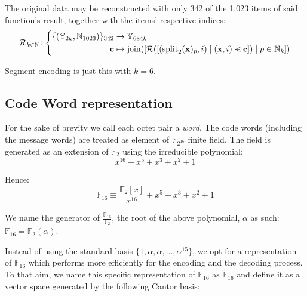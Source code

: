 The original data may be reconstructed with only 342 of the 1,023 items of said function's result, together with the items' respective indices:
\begin{equation}\label{eq:erasurecodinginv}
  \mathcal{R}_{k \in \N}\colon\left\{\begin{aligned}
    \{(\Y_{2k}, \N_{1023})\}_{342} &\to \Y_{684k} \\
    \mathbf{c} &\mapsto \join([
      \mathcal{R}([(\spl_2(\mathbf{x})_p, i) \mid (\mathbf{x}, i) \orderedin \mathbf{c}])
      \mid p \in \N_k
    ])
  \end{aligned}\right.
\end{equation}

Segment encoding is just this with $k = 6$.

\subsection{Code Word representation}

For the sake of brevity we call each octet pair a \emph{word}. The code words (including the message words) are treated as element of $\mathbb{F}_{2^{16}}$ finite field. The field is generated as an extension of $\mathbb{F}_2$ using the irreducible polynomial:
\begin{equation}
x^{16} + x^5 + x^3 + x^2 + 1
\end{equation}

Hence:
\begin{equation}
\mathbb{F}_{16} \equiv \frac{\mathbb{F}_2[x]}{x^{16}} + x^5 + x^3 + x^2 + 1
\end{equation}

We name the generator of $\frac{\mathbb{F}_{16}}{\mathbb{F}_2}$, the root of the above polynomial, $\alpha$ as such: $\mathbb{F}_{16} = \mathbb{F}_2(\alpha)$.

Instead of using the standard basis $\{1, \alpha, \alpha, \dots, \alpha^{15}\}$, we opt for a representation of $\mathbb{F}_{16}$ which performs more efficiently for the encoding and the decoding process. To that aim, we name this specific representation of $\mathbb{F}_{16}$ as $\tilde{\mathbb{F}}_{16}$ and define it as a vector space generated by the following Cantor basis:

